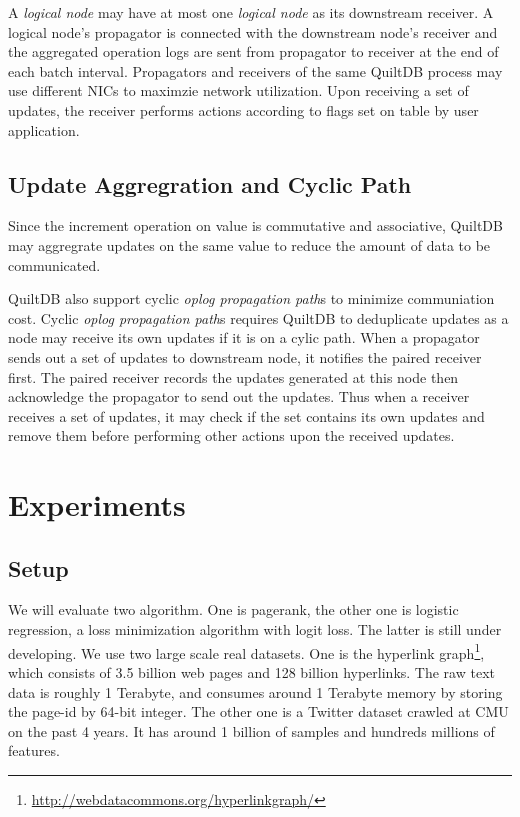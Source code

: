 \documentclass{acm_proc_article-sp}
\begin{document}
A \emph{logical node} may have at most one \emph{logical node} as its downstream
receiver. A logical node's propagator is connected with the downstream node's
receiver and the aggregated operation logs are sent from propagator to receiver
at the end of each batch interval. Propagators and receivers of the same QuiltDB
process may use different NICs to maximzie network utilization. Upon receiving
a set of updates, the receiver performs actions according to flags set on table
by user application.

\subsection{Update Aggregration and Cyclic Path}
\label{sec:update-aggreg}
\label{sec:cyclic-path}

Since the increment operation on value is commutative and associative, QuiltDB 
may aggregrate updates on the same value to reduce the amount of data to be 
communicated.

QuiltDB also support cyclic \emph{oplog propagation path}s to minimize 
communiation cost. Cyclic \emph{oplog propagation path}s requires QuiltDB to 
deduplicate updates as a node may receive its own updates if it is on a cylic
path. When a propagator sends out a set of updates to downstream node, it 
notifies the paired receiver first. The paired receiver records the updates 
generated at this node then acknowledge the propagator to send out the updates.
Thus when a receiver receives a set of updates, it may check if the set contains
its own updates and remove them before performing other actions upon the 
received updates.




\section{Experiments}

\subsection{Setup}

We will evaluate two algorithm. One is pagerank, the other one is logistic
regression, a loss minimization algorithm with logit loss. The latter is still
under developing. We use two large scale real datasets. One is the hyperlink
graph\footnote{\url{http://webdatacommons.org/hyperlinkgraph/}}, which consists
of 3.5 billion web pages and 128 billion hyperlinks. The raw text data is
roughly 1 Terabyte, and consumes around 1 Terabyte memory by storing the page-id
by 64-bit integer. The other one is a Twitter dataset crawled at CMU on the past
4 years. It has around 1 billion of samples and hundreds millions of
features.
\end{document}
